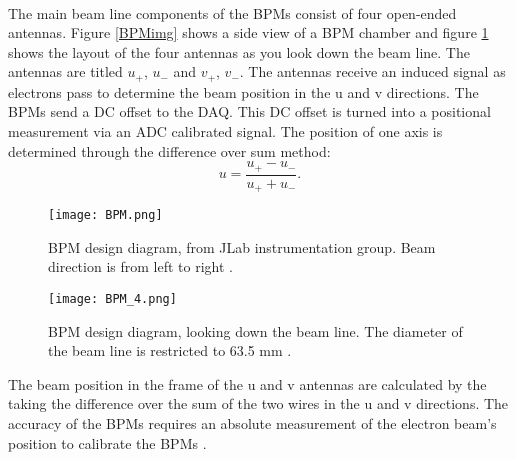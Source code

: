  \paragraph{} The main beam line components of the BPMs consist of four open-ended antennas. Figure \ref{BPMimg} shows a side view of a BPM chamber and figure \ref{BPM_4} shows the layout of the four antennas as you look down the beam line. The antennas are titled $u_+$, $u_-$ and $v_+$, $v_-$. The antennas receive an induced signal as electrons pass to determine the beam position in the u and v directions. The BPMs send a DC offset to the DAQ. This DC offset is turned into a positional measurement via an ADC calibrated signal. The position of one axis is determined through the difference over sum method:
 \begin{equation}
 	u = \frac{u_+ - u_-}{u_+ + u_-}.
 \end{equation} 
  	\begin{figure}[]
 	\centering
 	\texttt{[image: BPM.png]} 
 	\caption{BPM design diagram, from JLab instrumentation	group. Beam direction is from left to right \cite{BPM2}. }
 	\label{BPMimg}
	\vspace{1.5cm}
	\centering
 	\texttt{[image: BPM\_4.png]}  	
 	\caption{BPM design diagram, looking down the beam line\cite{BPM2}. The diameter of the beam line is restricted to 63.5 mm \cite{HallA}.}
 	\label{BPM_4}
 \end{figure} 
  
The beam position in the frame of the u and v antennas are calculated by the taking the difference over the sum of the two wires in the u and v directions. The accuracy of the BPMs requires an absolute measurement of the electron beam's position to calibrate the BPMs \cite{BPM,BPM2}.


